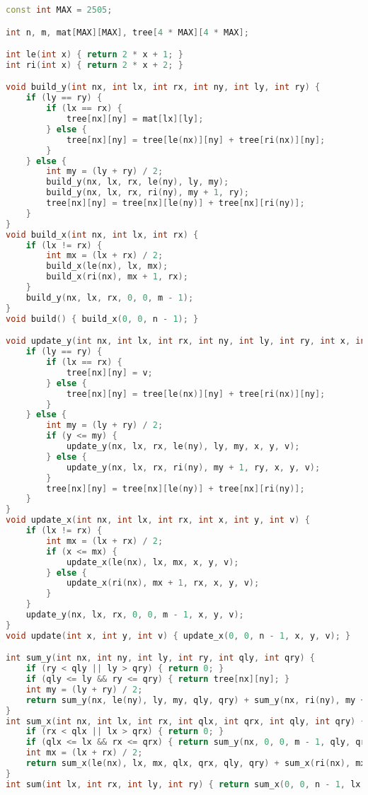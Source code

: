 \documentclass[11pt, a4paper, twoside]{book}
\begin{document}
\hfill

\begin{lstlisting}[language=C++]
const int MAX = 2505;

int n, m, mat[MAX][MAX], tree[4 * MAX][4 * MAX];

int le(int x) { return 2 * x + 1; }
int ri(int x) { return 2 * x + 2; }

void build_y(int nx, int lx, int rx, int ny, int ly, int ry) {
    if (ly == ry) {
        if (lx == rx) {
            tree[nx][ny] = mat[lx][ly];
        } else {
            tree[nx][ny] = tree[le(nx)][ny] + tree[ri(nx)][ny];
        }
    } else {
        int my = (ly + ry) / 2;
        build_y(nx, lx, rx, le(ny), ly, my);
        build_y(nx, lx, rx, ri(ny), my + 1, ry);
        tree[nx][ny] = tree[nx][le(ny)] + tree[nx][ri(ny)];
    }
}
void build_x(int nx, int lx, int rx) {
    if (lx != rx) {
        int mx = (lx + rx) / 2;
        build_x(le(nx), lx, mx);
        build_x(ri(nx), mx + 1, rx);
    }
    build_y(nx, lx, rx, 0, 0, m - 1);
}
void build() { build_x(0, 0, n - 1); }

void update_y(int nx, int lx, int rx, int ny, int ly, int ry, int x, int y, int v) {
    if (ly == ry) {
        if (lx == rx) {
            tree[nx][ny] = v;
        } else {
            tree[nx][ny] = tree[le(nx)][ny] + tree[ri(nx)][ny];
        }
    } else {
        int my = (ly + ry) / 2;
        if (y <= my) {
            update_y(nx, lx, rx, le(ny), ly, my, x, y, v);
        } else {
            update_y(nx, lx, rx, ri(ny), my + 1, ry, x, y, v);
        }
        tree[nx][ny] = tree[nx][le(ny)] + tree[nx][ri(ny)];
    }
}
void update_x(int nx, int lx, int rx, int x, int y, int v) {
    if (lx != rx) {
        int mx = (lx + rx) / 2;
        if (x <= mx) {
            update_x(le(nx), lx, mx, x, y, v);
        } else {
            update_x(ri(nx), mx + 1, rx, x, y, v);
        }
    }
    update_y(nx, lx, rx, 0, 0, m - 1, x, y, v);
}
void update(int x, int y, int v) { update_x(0, 0, n - 1, x, y, v); }

int sum_y(int nx, int ny, int ly, int ry, int qly, int qry) {
    if (ry < qly || ly > qry) { return 0; }
    if (qly <= ly && ry <= qry) { return tree[nx][ny]; }
    int my = (ly + ry) / 2;
    return sum_y(nx, le(ny), ly, my, qly, qry) + sum_y(nx, ri(ny), my + 1, ry, qly, qry);
}
int sum_x(int nx, int lx, int rx, int qlx, int qrx, int qly, int qry) {
    if (rx < qlx || lx > qrx) { return 0; }
    if (qlx <= lx && rx <= qrx) { return sum_y(nx, 0, 0, m - 1, qly, qry); }
    int mx = (lx + rx) / 2;
    return sum_x(le(nx), lx, mx, qlx, qrx, qly, qry) + sum_x(ri(nx), mx + 1, rx, qlx, qrx, qly, qry);
}
int sum(int lx, int rx, int ly, int ry) { return sum_x(0, 0, n - 1, lx, rx, ly, ry); }
\end{lstlisting}
\end{document}

